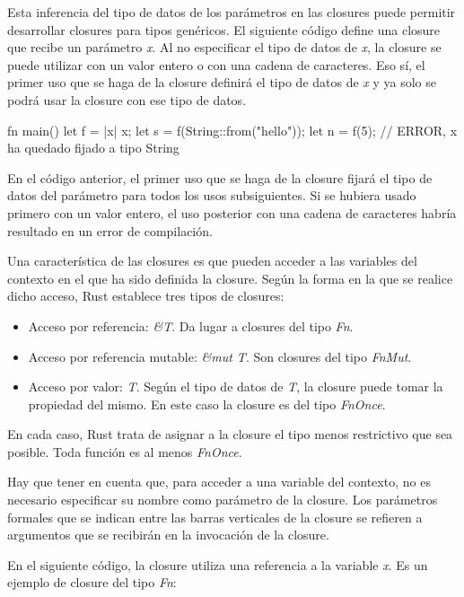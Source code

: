 Esta inferencia del tipo de datos de los parámetros en las closures puede permitir desarrollar closures para tipos genéricos. El siguiente código define una closure que recibe un parámetro \textit{x}. Al no especificar el tipo de datos de \textit{x}, la closure se puede utilizar con un valor entero o con una cadena de caracteres. Eso sí, el primer uso que se haga de la closure definirá el tipo de datos de \textit{x} y ya solo se podrá usar la closure con ese tipo de datos.

\vspace{0.7em}
\begin{Codigo}
fn main() {
   let f = |x| x;
   let s = f(String::from("hello"));
   let n = f(5); // ERROR, x ha quedado fijado a  tipo String 
}
\end{Codigo}

En el código anterior, el primer uso que se haga de la closure fijará el tipo de datos del parámetro para todos los usos subsiguientes. Si se hubiera usado primero con un valor entero, el uso posterior con una cadena de caracteres habría resultado en un error de compilación. 

Una característica de las closures es que pueden acceder a las variables del contexto en el que ha sido definida la closure. Según la forma en la que se realice dicho acceso, Rust establece tres tipos de closures:

\begin{itemize}
   \item Acceso por referencia: \textit{\&T}. Da lugar a closures del tipo \textit{Fn}.
   \item Acceso por referencia mutable: \textit{\&mut T}. Son closures del tipo \textit{FnMut}.
   \item Acceso por valor: \textit{T}. Según el tipo de datos de \textit{T}, la closure puede tomar la propiedad del mismo. En este caso la closure es del tipo \textit{FnOnce}.
\end{itemize}

En cada caso, Rust trata de asignar a la closure el tipo menos restrictivo que sea posible. Toda función es al menos \textit{FnOnce}. 

Hay que tener en cuenta que, para acceder a una variable del contexto, no es necesario especificar su nombre como parámetro de la closure. Los parámetros formales que se indican entre las barras verticales de la closure se refieren a argumentos que se recibirán en la invocación de la closure.

En el siguiente código, la closure utiliza una referencia a la variable \textit{x}. Es un ejemplo de closure del tipo \textit{Fn}:

